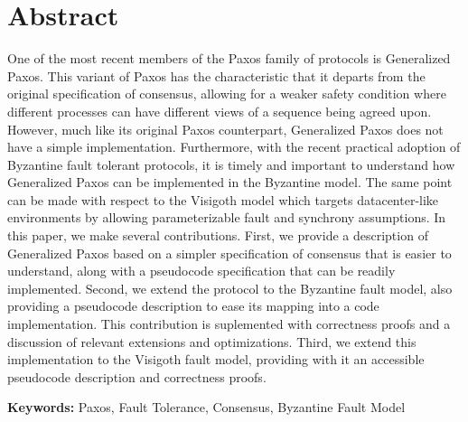 
\section*{Abstract}


One of the most recent members of the Paxos family of
protocols is Generalized Paxos. This variant of Paxos has the characteristic that it departs from the original specification of consensus, allowing for a
weaker safety condition where different processes can have different views of a sequence being agreed upon. However, much like its original Paxos counterpart, Generalized Paxos does not have a simple implementation. Furthermore, with the recent practical adoption of Byzantine fault tolerant protocols, it is timely and important to understand how Generalized Paxos can be implemented in the Byzantine model. The same point can be made with respect to the Visigoth model which targets datacenter-like environments by allowing parameterizable fault and synchrony assumptions. In this paper, we make several contributions. First, we provide a description of Generalized Paxos based on a simpler specification of consensus that is easier to understand, along with a pseudocode specification that can be readily implemented. Second, we extend the protocol to the Byzantine fault model, also providing a pseudocode description to ease its mapping into a code implementation. This contribution is suplemented with correctness proofs and a discussion of relevant extensions and optimizations. Third, we extend this implementation to the Visigoth fault model, providing with it an accessible pseudocode description and correctness proofs. 

\vfill

\textbf{\Large Keywords:} Paxos, Fault Tolerance, Consensus, Byzantine Fault Model

